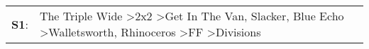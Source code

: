 \begin{supertabular}{p{0.03\textwidth}p{0.92\textwidth}}
 \textbf{S1}:  &  The Triple Wide\textsuperscript{} \textgreater \enspace 2x2\textsuperscript{} \textgreater \enspace Get In The Van\textsuperscript{}, \enspace Slacker\textsuperscript{}, \enspace Blue Echo\textsuperscript{} \textgreater \enspace Walletsworth\textsuperscript{}, \enspace Rhinoceros\textsuperscript{} \textgreater \enspace FF\textsuperscript{} \textgreater \enspace Divisions\textsuperscript{}  \enspace  \\
\end{supertabular}
